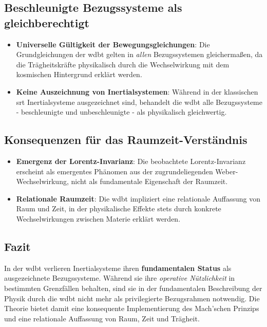 \subsection{Beschleunigte Bezugssysteme als gleichberechtigt}

\begin{itemize}
    \item \textbf{Universelle Gültigkeit der Bewegungsgleichungen}: Die Grundgleichungen der \gls{wdbt} gelten in \emph{allen} Bezugssystemen gleichermaßen, da die Trägheitskräfte physikalisch durch die Wechselwirkung mit dem kosmischen Hintergrund erklärt werden.
    \item \textbf{Keine Auszeichnung von Inertialsystemen}: Während in der klassischen \gls{srt} Inertialsysteme ausgezeichnet sind, behandelt die \gls{wdbt} alle Bezugssysteme - beschleunigte und unbeschleunigte - als physikalisch gleichwertig.
\end{itemize}

\subsection{Konsequenzen für das Raumzeit-Verständnis}

\begin{itemize}
    \item \textbf{Emergenz der Lorentz-Invarianz}: Die beobachtete Lorentz-Invarianz erscheint als emergentes Phänomen aus der zugrundeliegenden Weber-Wechselwirkung, nicht als fundamentale Eigenschaft der Raumzeit.
    \item \textbf{Relationale Raumzeit}: Die \gls{wdbt} impliziert eine relationale Auffassung von Raum und Zeit, in der physikalische Effekte stets durch konkrete Wechselwirkungen zwischen Materie erklärt werden.
\end{itemize}

\subsection{Fazit}

In der \gls{wdbt} verlieren Inertialsysteme ihren \textbf{fundamentalen Status} als ausgezeichnete Bezugssysteme. Während sie ihre \emph{operative Nützlichkeit} in bestimmten Grenzfällen behalten, sind sie in der fundamentalen Beschreibung der Physik durch die \gls{wdbt} nicht mehr als privilegierte Bezugsrahmen notwendig. Die Theorie bietet damit eine konsequente Implementierung des Mach'schen Prinzips und eine relationale Auffassung von Raum, Zeit und Trägheit.
